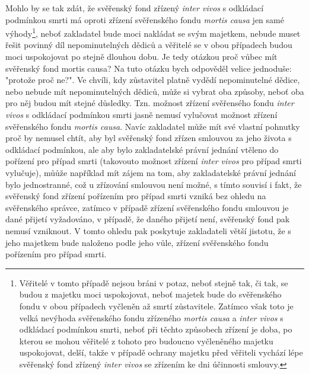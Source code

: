 \documentclass{article}
\begin{document}

Mohlo by se tak zdát, že svěřenský fond zřízený \textit{inter vivos} s odkládací podmínkou smrti má oproti zřízení svěřenského fondu \textit{mortis causa} jen samé výhody\footnote{Věřitelé v tomto případě nejsou bráni v potaz, neboť stejně tak, či tak, se budou z majetku moci uspokojovat, neboť majetek bude do svěřenského fondu v obou případech vyčleněn až smrtí zůstavitele. Zatímco však toto je velká nevýhoda svěřenského fondu zřízeného \textit{mortis causa} a \textit{inter vivos} s odkládací podmínkou smrti, neboť při těchto způsobech zřízení je doba, po kterou se mohou věřitelé z tohoto pro budoucno vyčleněného majetku uspokojovat, delší, takže v případě ochrany majetku před věřiteli vychází lépe svěřenský fond zřízený \textit{inter vivos} se zřízením ke dni účinnosti smlouvy.}, neboť zakladatel bude moci nakládat se svým majetkem, nebude muset řešit povinný díl nepominutelných dědiců a věřitelé se v obou případech budou moci uspokojovat po stejně dlouhou dobu. Je tedy otázkou proč vůbec mít svěřenský fond mortis causa? Na tuto otázku bych odpověděl velice jednoduše: "protože proč ne?". Ve chvíli, kdy zůstavitel platně vydědí nepominutelné dědice, nebo nebude mít nepominutelných dědiců, může si vybrat oba způsoby, neboť oba pro něj budou mít stejné důsledky. Tzn. možnost zřízení svěřensého fondu \textit{inter vivos} s odkládací podmínkou smrti jasně nemusí vylučovat možnost zřízení svěřenského fondu \textit{mortis causa}. Navíc zakladatel může mít své vlastní pohnutky proč by nemusel chtít, aby byl svěřenský fond zřízen smlouvou za jeho života s odkládací podmínkou, ale aby bylo zakladatelské právní jednání vtěleno do pořízení pro případ smrti (takovouto možnost zřízení \textit{inter vivos} pro případ smrti vylučuje), můůže například mít zájem na tom, aby zakladatelské právní jednání bylo jednostranné, což u zřízování smlouvou není možné, s tímto souvisí i fakt, že svěřenský fond zřízení pořízením pro případ smrti vzniká bez ohledu na svěřenského správce, zatímco v případě zřízení svěřenského fondu smlouvou je dané přijetí vyžadováno, v případě, že daného přijetí není, svěřenský fond pak nemusí vzniknout. V tomto ohledu pak poskytuje zakladateli větší jistotu, že s jeho majetkem bude naloženo podle jeho vůle, zřízení svěřenského fondu pořízením pro případ smrti.\\
\end{document}
